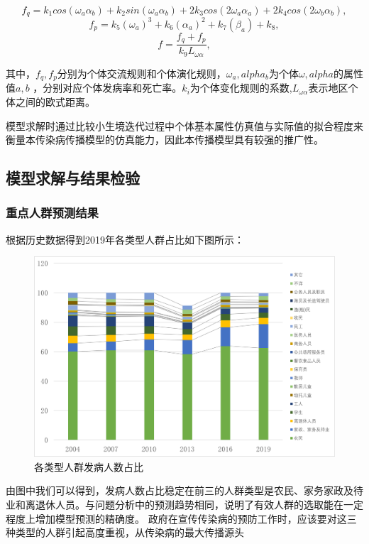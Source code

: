 \documentclass{whutmod}
\begin{document}
\begin{equation*}
    f_q=k_1cos(\omega_a\alpha_b)+k_2sin(\omega_a\alpha_b)+2k_3cos(2\omega_a\alpha_a)+2k_4cos(2\omega_b\alpha_b), 
\end{equation*}
\begin{equation*}
    f_p=k_5(\omega_a)^3+k_6(\alpha_a)^2+k_7(\beta_a)+k_8,
\end{equation*}
\begin{equation}
    f=\frac{f_q+f_p}{k_9L_{\omega\alpha}},
\end{equation}

其中，$f_q,f_p$分别为个体交流规则和个体演化规则，$\omega_a,alpha_b$为个体$\omega,alpha$的属性值$a,b$ ，分别对应个体发病率和死亡率。$k_i$为个体变化规则的系数,$L_{\omega\alpha}$表示地区个体之间的欧式距离。

模型求解时通过比较小生境迭代过程中个体基本属性仿真值与实际值的拟合程度来衡量本传染病传播模型的仿真能力，因此本传播模型具有较强的推广性。

\subsection{模型求解与结果检验}
\subsubsection{重点人群预测结果}
根据历史数据得到2019年各类型人群占比如下图所示：
\begin{figure}[h]
    \centering
    \includegraphics[width=.9\textwidth]{4.png}
    \caption{各类型人群发病人数占比}
\end{figure}

由图中我们可以得到，发病人数占比稳定在前三的人群类型是农民、家务家政及待业和离退休人员。与问题分析中的预测趋势相同，说明了有效人群的选取能在一定程度上增加模型预测的精确度。
政府在宣传传染病的预防工作时，应该要对这三种类型的人群引起高度重视，从传染病的最大传播源头
\end{document}
